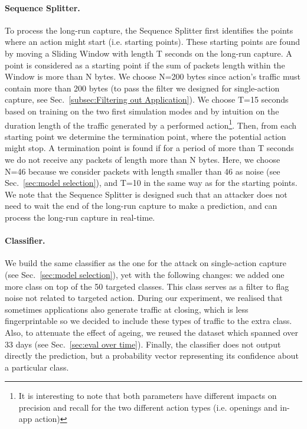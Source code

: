 \paragraph{Sequence Splitter.} To process the long-run capture, the Sequence Splitter first identifies the points where an action might start (i.e. starting points). These starting points are found by moving a Sliding Window with length T seconds on the long-run capture. A point is considered as a starting point if the sum of packets length within the Window is more than N bytes. We choose N=200 bytes since action's traffic must contain more than 200 bytes (to pass the filter we designed for single-action capture, see Sec.~\ref{subsec:Filtering out Application}). We choose T=15 seconds based on training on the two first simulation modes and by intuition on the duration length of the traffic generated by a performed action\footnote{It is interesting to note that both parameters have different impacts on precision and recall for the two different action types (i.e. openings and in-app action)}. Then, from each starting point we determine the termination point, where the potential action might stop. A termination point is found if for a period of more than T seconds we do not receive any packets of length more than N bytes. Here, we choose N=46 because we consider packets with length smaller than 46 as noise (see Sec.~\ref{sec:model selection}), and T=10 in the same way as for the starting points. We note that the Sequence Splitter is designed such that an attacker does not need to wait the end of the long-run capture to make a prediction, and can process the long-run capture in real-time.


\paragraph{Classifier.} We build the same classifier as the one for the attack on single-action capture (see Sec.~\ref{sec:model selection}), yet with the following changes: we added one more class on top of the 50 targeted classes. This class serves as a filter to flag noise not related to targeted action. During our experiment, we realised that sometimes applications also generate traffic at closing, which is less fingerprintable so we decided to include these types of traffic to the extra class. Also, to attenuate the effect of ageing, we reused the dataset which spanned over 33 days (see Sec.~\ref{sec:eval over time}). Finally, the classifier does not output directly the prediction, but a probability vector representing its confidence about a particular class.

